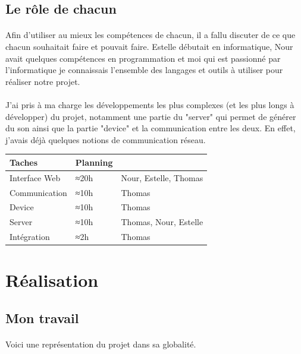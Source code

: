 \documentclass[12pt]{article}
\begin{document}
	\subsection{Le rôle de chacun}
	\paragraph{}
	Afin d’utiliser au mieux les compétences de chacun, il a fallu discuter de ce que chacun souhaitait faire et pouvait faire. Estelle débutait en informatique, Nour avait quelques compétences en programmation et moi qui est passionné par l’informatique je connaissais l’ensemble des langages et outils à utiliser pour réaliser notre projet.
	
	\paragraph{}
	J’ai pris à ma charge les développements les plus complexes (et les plus longs à développer) du projet, notamment une partie du "server" qui permet de générer du son ainsi que la partie "device" et la communication entre les deux. En effet, j'avais déjà quelques notions de communication réseau.\\
	
	\noindent
	\begin{tabular}{|p{}|p{}|p{}|}
		\hline
		Taches&Planning&\\\hline
		Interface Web&≈20h&Nour, Estelle, Thomas\\
		Communication&≈10h&Thomas\\
		Device&≈10h&Thomas\\
		Server&≈10h&Thomas, Nour, Estelle\\
		Intégration&≈2h&Thomas\\
		\hline
	\end{tabular}

	\newpage
	\section{Réalisation}
	\subsection{Mon travail}
	\paragraph{}
	Voici une représentation du projet dans sa globalité.
	
\end{document}
